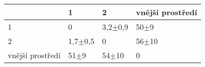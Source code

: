 \begin{tabular}{llll}
\toprule
{} &          1 &          2 & vnější prostředí \\
\midrule
1                &          0 &  3,2$\pm$0,9 &           50$\pm$9 \\
2                &  1,7$\pm$0,5 &          0 &          56$\pm$10 \\
vnější prostředí &     51$\pm$9 &    54$\pm$10 &                0 \\
\bottomrule
\end{tabular}
